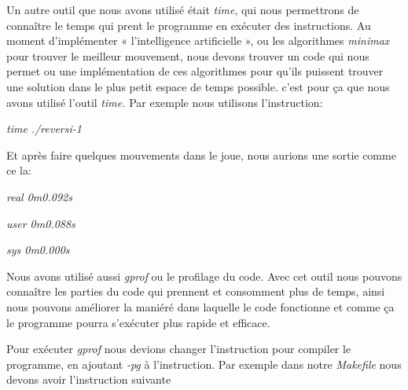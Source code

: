 \documentclass[a4paper,12pt]{article}
\begin{document}
\noindent \begin{justify}
Un autre outil que nous avons utilisé était \textit{time}, qui nous permettrons de connaître le temps qui prent le programme en exécuter des instructions. Au moment d’implémenter « l’intelligence artificielle », ou les algorithmes \textit{minimax} pour trouver le meilleur mouvement, nous devons trouver un code qui nous permet ou une implémentation de ces algorithmes pour qu’ils puissent trouver une solution dans le plus petit espace de temps possible. c’est pour ça que nous avons utilisé l’outil \textit{time. }Par exemple nous utilisons l’instruction:
\end{justify}\par


\noindent \begin{Center}
\textit{time ./reversi-1}
\end{Center}\par


\vspace{\baselineskip}

\noindent Et après faire quelques mouvements dans le joue, nous aurions une sortie comme ce la:\par


\noindent \begin{Center}
\textit{real 0m0.092s}
\end{Center}\par


\noindent \begin{Center}
\textit{user 0m0.088s}
\end{Center}\par


\noindent \begin{Center}
\textit{sys 0m0.000s}
\end{Center}\par


\vspace{\baselineskip}

\noindent \begin{justify}
Nous avons utilisé aussi \textit{gprof} ou le profilage du code. Avec cet outil nous pouvons connaître les parties du code qui prennent et consomment plus de temps, ainsi nous pouvons améliorer la maniéré dans laquelle le code fonctionne et comme ça le programme pourra s’exécuter plus rapide et efficace.
\end{justify}\par

\noindent \begin{justify}
Pour exécuter \textit{gprof} nous devions changer l’instruction pour compiler le programme, en ajoutant \textit{-pg} à l’instruction. Par exemple dans notre \textit{Makefile} nous devons avoir l’instruction suivante
\end{justify}\par
\end{document}

